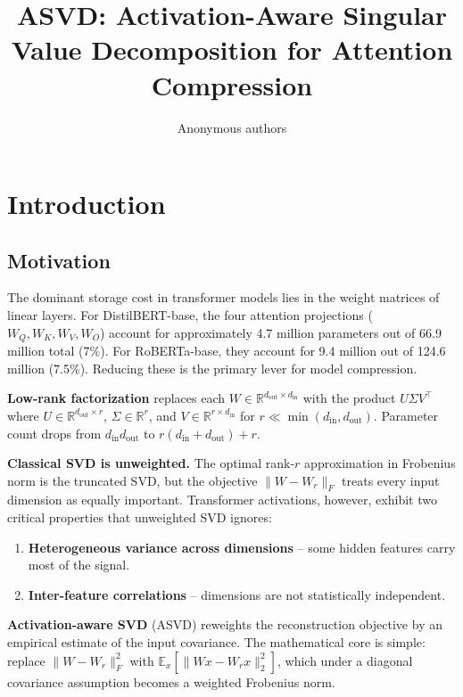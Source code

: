 \title{\textbf{ASVD: Activation-Aware Singular Value Decomposition for Attention Compression}}

\author{Anonymous authors}



\section{Introduction}

\subsection{Motivation}

The dominant storage cost in transformer models lies in the weight matrices 
of linear layers. For DistilBERT-base, the four attention projections 
($W_Q, W_K, W_V, W_O$) account for approximately 4.7 million parameters 
out of 66.9 million total (7\%). For RoBERTa-base, they account for 
9.4 million out of 124.6 million (7.5\%). Reducing these is the primary 
lever for model compression.

\textbf{Low-rank factorization} replaces each $W \in \mathbb{R}^{d_\text{out} \times d_\text{in}}$ 
with the product $U \Sigma V^\top$ where $U \in \mathbb{R}^{d_\text{out} \times r}$, 
$\Sigma \in \mathbb{R}^r$, and $V \in \mathbb{R}^{r \times d_\text{in}}$ for 
$r \ll \min(d_\text{in}, d_\text{out})$. Parameter count drops from 
$d_\text{in} d_\text{out}$ to $r(d_\text{in} + d_\text{out}) + r$.

\textbf{Classical SVD is unweighted.} The optimal rank-$r$ approximation in 
Frobenius norm is the truncated SVD, but the objective 
$\|W - W_r\|_F$ treats every input dimension as equally important. Transformer 
activations, however, exhibit two critical properties that unweighted SVD 
ignores:

\begin{enumerate}
\item \textbf{Heterogeneous variance across dimensions} -- some hidden features
  carry most of the signal.
\item \textbf{Inter-feature correlations} -- dimensions are not statistically
  independent.

\end{enumerate}
\textbf{Activation-aware SVD} (ASVD) reweights the reconstruction objective by 
an empirical estimate of the input covariance. The mathematical core is 
simple: replace $\|W - W_r\|_F^2$ with 
$\mathbb{E}_x[\|Wx - W_r x\|_2^2]$, which under a diagonal covariance 
assumption becomes a weighted Frobenius norm.

